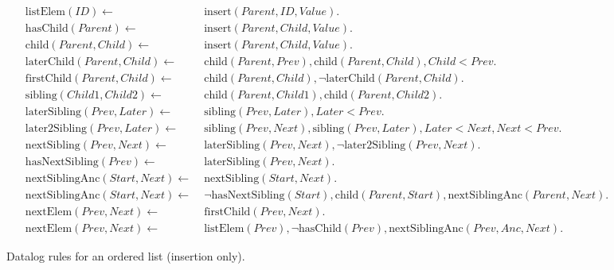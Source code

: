 \documentclass[twocolumn,10pt]{article}
\begin{document}



\begin{figure*}
\begin{align*}
    \mathrm{listElem}(\mathit{ID}) \leftarrow\; &
    \mathrm{insert}(\mathit{Parent}, \mathit{ID}, \mathit{Value}).
\\
    \mathrm{hasChild}(\mathit{Parent}) \leftarrow\; &
    \mathrm{insert}(\mathit{Parent}, \mathit{Child}, \mathit{Value}).
\\
    \mathrm{child}(\mathit{Parent}, \mathit{Child}) \leftarrow\; &
    \mathrm{insert}(\mathit{Parent}, \mathit{Child}, \mathit{Value}).
\\
    \mathrm{laterChild}(\mathit{Parent}, \mathit{Child}) \leftarrow\; &
    \mathrm{child}(\mathit{Parent}, \mathit{Prev}),
    \mathrm{child}(\mathit{Parent}, \mathit{Child}),
    \mathit{Child} < \mathit{Prev}.
\\
    \mathrm{firstChild}(\mathit{Parent}, \mathit{Child}) \leftarrow\; &
    \mathrm{child}(\mathit{Parent}, \mathit{Child}),
    \neg\mathrm{laterChild}(\mathit{Parent}, \mathit{Child}).
\\
    \mathrm{sibling}(\mathit{Child1}, \mathit{Child2}) \leftarrow\; &
    \mathrm{child}(\mathit{Parent}, \mathit{Child1}),
    \mathrm{child}(\mathit{Parent}, \mathit{Child2}).
\\
    \mathrm{laterSibling}(\mathit{Prev}, \mathit{Later}) \leftarrow\; &
    \mathrm{sibling}(\mathit{Prev}, \mathit{Later}),
    \mathit{Later} < \mathit{Prev}.
\\
    \mathrm{later2Sibling}(\mathit{Prev}, \mathit{Later}) \leftarrow\; &
    \mathrm{sibling}(\mathit{Prev}, \mathit{Next}),
    \mathrm{sibling}(\mathit{Prev}, \mathit{Later}),
    \mathit{Later} < \mathit{Next},
    \mathit{Next} < \mathit{Prev}.
\\
    \mathrm{nextSibling}(\mathit{Prev}, \mathit{Next}) \leftarrow\; &
    \mathrm{laterSibling}(\mathit{Prev}, \mathit{Next}),
    \neg\mathrm{later2Sibling}(\mathit{Prev}, \mathit{Next}).
\\
    \mathrm{hasNextSibling}(\mathit{Prev}) \leftarrow\; &
    \mathrm{laterSibling}(\mathit{Prev}, \mathit{Next}).
\\
    \mathrm{nextSiblingAnc}(\mathit{Start}, \mathit{Next}) \leftarrow\; &
    \mathrm{nextSibling}(\mathit{Start}, \mathit{Next}).
\\
    \mathrm{nextSiblingAnc}(\mathit{Start}, \mathit{Next}) \leftarrow\; &
    \neg\mathrm{hasNextSibling}(\mathit{Start}),
    \mathrm{child}(\mathit{Parent}, \mathit{Start}),
    \mathrm{nextSiblingAnc}(\mathit{Parent}, \mathit{Next}).
\\
    \mathrm{nextElem}(\mathit{Prev}, \mathit{Next}) \leftarrow\; &
    \mathrm{firstChild}(\mathit{Prev}, \mathit{Next}).
\\
    \mathrm{nextElem}(\mathit{Prev}, \mathit{Next}) \leftarrow\; &
    \mathrm{listElem}(\mathit{Prev}),
    \neg\mathrm{hasChild}(\mathit{Prev}),
    \mathrm{nextSiblingAnc}(\mathit{Prev}, \mathit{Anc}, \mathit{Next}).
\end{align*}
\caption{Datalog rules for an ordered list (insertion only).}
\end{figure*}

{\footnotesize

{}}
\end{document}
